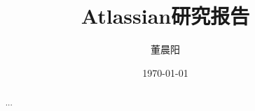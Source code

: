 \documentclass[a4paper,12pt]{ctexart}
\title{Atlassian研究报告}
\author{董晨阳}
\date{\today}
\begin{document}
\maketitle
\begin{abstract}
    ...
\end{abstract}





\end{document}
